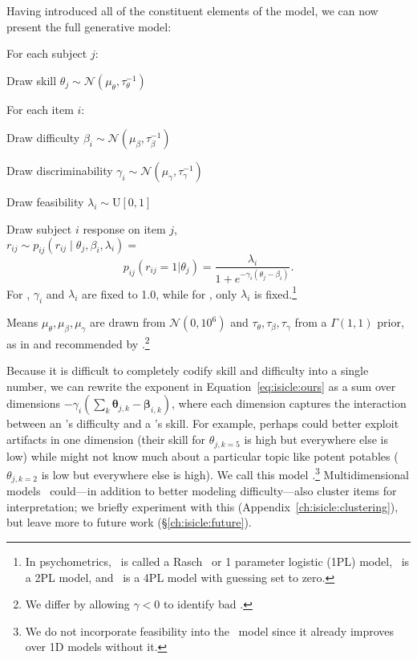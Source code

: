 Having introduced all of the constituent elements of the model, we can
now present the full generative model:
\begin{enumerate*}
  \item For each subject $j$:
  \begin{enumerate*}
    \item Draw skill $\theta_j \sim \mathcal{N}(\mu_\theta, \tau_\theta^{-1})$
  \end{enumerate*}
  \item For each item $i$:
  \begin{enumerate*}
    \item Draw difficulty $\beta_i \sim\mathcal{N}(\mu_\beta, \tau_\beta^{-1})$
    \item Draw discriminability $\gamma_i \sim \mathcal{N}(\mu_\gamma, \tau_\gamma^{-1})$
    \item Draw feasibility $\lambda_i \sim \text{U}[0,1]$
  \end{enumerate*}
  \item Draw subject $i$ response on item $j$,\\$r_{ij} \sim p_{ij}(r_{ij} \mid \theta_j, \beta_i, \lambda_i )=$
    \begin{equation}
      p_{ij}(r_{ij}=1|\theta_j)=\frac{\lambda_i}{1+e^{-\gamma_i(\theta_j-\beta_i)}}.
      \label{eq:isicle:ours}
    \end{equation}
    For , $\gamma_i$ and $\lambda_i$ are fixed to 1.0, while for
    , only $\lambda_i$ is fixed.\footnote{In psychometrics, ~is called a Rasch~\citep{rasch1960studies} or 1 parameter logistic (1PL) model, ~is a 2PL model, and ~is a 4PL model with guessing set to zero.}
\end{enumerate*}
Means $\mu_\theta,\mu_\beta,\mu_\gamma$ are drawn from
$\mathcal{N}(0,10^6)$ and $\tau_\theta,\tau_\beta,\tau_\gamma$
from a $\Gamma(1,1)$ prior, as in \citet{lalor2019latent} and
recommended by \citet{natesan2016birt}.\footnote{We differ by
  allowing $\gamma<0$ to identify bad \itms{}.  }

Because it is difficult to completely codify skill and difficulty into
a single number, we can rewrite the exponent in
Equation~\ref{eq:isicle:ours} as a sum over dimensions
$-\gamma_i(\sum_k \bm{\theta}_{j,k}-\bm{\beta}_{i,k})$,
where each dimension captures the interaction between an \itm{}'s
difficulty and a \subj{}'s skill.
For example, perhaps \dumb{} could better exploit artifacts in one
dimension (their skill for $\theta_{j,k=5}$ is high but everywhere
else is low) while \smart{} might not know much about a particular
topic like potent potables ($\theta_{j,k=2}$ is low but everywhere
else is high).
We call this model {\bf {}}.\footnote{
  We do not incorporate feasibility into the ~model since it already improves over 1D models without it.
}
Multidimensional \irt{} models~\citep{reckase2009mirt} could---in addition to better modeling
difficulty---also cluster items for interpretation; we briefly
experiment with this (Appendix~\ref{ch:isicle:clustering}), but leave
more to future work (\S\ref{ch:isicle:future}).

